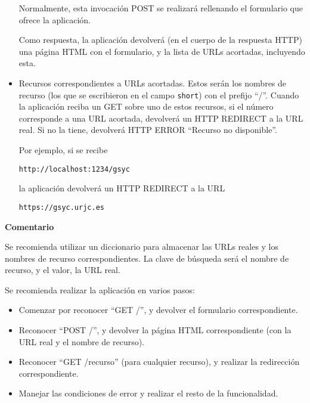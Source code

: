 \begin{itemize}
Normalmente, esta invocación POST se realizará rellenando el formulario que ofrece la aplicación.

Como respuesta, la aplicación devolverá (en el cuerpo de la respuesta HTTP) una página HTML con el formulario, y la lista de URLs acortadas, incluyendo esta.


\item Recursos correspondientes a URLs acortadas. Estos serán los nombres de recurso (los que se escribieron en el campo \texttt{short}) con el prefijo ``/''. Cuando la aplicación reciba un GET sobre uno de estos recursos, si el número corresponde a una URL acortada, devolverá un HTTP REDIRECT a la URL real. Si no la tiene, devolverá HTTP ERROR ``Recurso no disponible''.

Por ejemplo, si se recibe 

\verb|http://localhost:1234/gsyc|

la aplicación devolverá un HTTP REDIRECT a la URL

\verb|https://gsyc.urjc.es|

\end{itemize}


\textbf{Comentario}

Se recomienda utilizar un diccionario para almacenar las URLs reales y los nombres de recurso correspondientes. La clave de búsqueda será el nombre de recurso, y el valor, la URL real.

Se recomienda realizar la aplicación en varios pasos:

\begin{itemize}
\item Comenzar por reconocer ``GET /'', y devolver el formulario correspondiente.
\item Reconocer ``POST /'', y devolver la página HTML correspondiente (con la URL real y el nombre de recurso).
\item Reconocer ``GET /recurso'' (para cualquier recurso), y realizar la redirección correspondiente.
\item Manejar las condiciones de error y realizar el resto de la funcionalidad.
\end{itemize}

